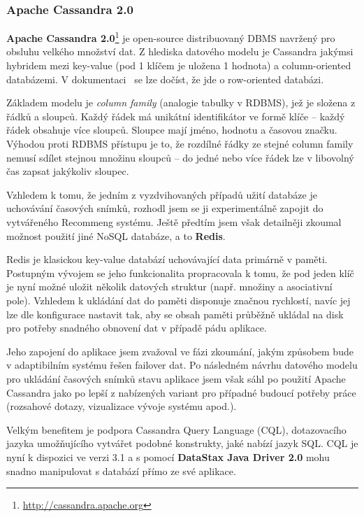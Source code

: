 \documentclass[thesis=M,czech]{FITthesis}[2014/05/07]
\begin{document}
\subsubsection{Apache Cassandra 2.0}
\textbf{Apache Cassandra 2.0}\footnote{\url{http://cassandra.apache.org}} je open-source distribuovaný DBMS navržený pro obsluhu velkého množství dat. Z hlediska datového modelu je Cassandra jakýmsi hybridem mezi key-value (pod 1 klíčem je uložena 1 hodnota) a column-oriented databázemi. V dokumentaci~\cite{cassdoc} se lze dočíst, že jde o row-oriented databázi.

Základem modelu je \emph{column family} (analogie tabulky v RDBMS), jež je složena z řádků a sloupců. Každý řádek má unikátní identifikátor ve formě klíče – každý řádek obsahuje více sloupců. Sloupce mají jméno, hodnotu a časovou značku. Výhodou proti RDBMS přístupu je to, že rozdílné řádky ze stejné column family nemusí sdílet stejnou množinu sloupců – do jedné nebo více řádek lze v libovolný čas zapsat jakýkoliv sloupec.

Vzhledem k tomu, že jedním z vyzdvihovaných případů užití databáze je uchovávání časových snímků, rozhodl jsem se ji experimentálně zapojit do vytvářeného Recommeng systému. Ještě předtím jsem však detailněji zkoumal možnost použití jiné NoSQL databáze, a to \textbf{Redis}. 

Redis je klasickou key-value databází uchovávající data primárně v paměti. Postupným vývojem se jeho funkcionalita propracovala k tomu, že pod jeden klíč je nyní možné uložit několik datových struktur (např. množiny a asociativní pole). Vzhledem k ukládání dat do paměti disponuje značnou rychlostí, navíc jej lze dle konfigurace nastavit tak, aby se obsah paměti průběžně ukládal na disk pro potřeby snadného obnovení dat v případě pádu aplikace.

Jeho zapojení do aplikace jsem zvažoval ve fázi zkoumání, jakým způsobem bude v adaptibilním systému řešen failover dat. Po následném návrhu datového modelu pro ukládání časových snímků stavu aplikace jsem však sáhl po použití Apache Cassandra jako po lepší z nabízených variant pro případné budoucí potřeby práce (rozsahové dotazy, vizualizace vývoje systému apod.). 

Velkým benefitem je podpora Cassandra Query Language (CQL), dotazovacího jazyka umožňujícího vytvářet podobné konstrukty, jaké nabízí jazyk SQL. CQL je nyní k dispozici ve verzi 3.1 a s pomocí \textbf{DataStax Java Driver 2.0} mohu snadno manipulovat s databází přímo ze své aplikace. 
\end{document}
